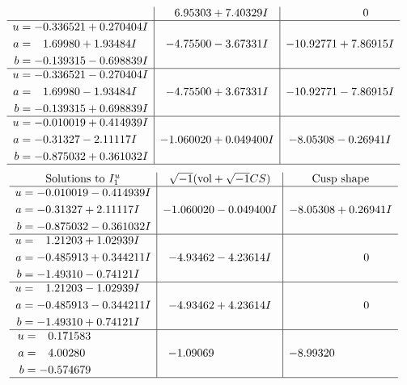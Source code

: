 \documentclass[1p]{elsarticle_modified}
\theoremstyle{definition}
\newcommand{\I}{\sqrt{-1}}
\begin{document}
$$\begin{array}{c|c|c}
 & \phantom{-}6.95303 + 7.40329 I & \phantom{-0.000000 } 0 \\ \hline\begin{aligned}
u &= -0.336521 + 0.270404 I \\
a &= \phantom{-}1.69980 + 1.93484 I \\
b &= -0.139315 - 0.698839 I\end{aligned}
 & -4.75500 - 3.67331 I & -10.92771 + 7.86915 I \\ \hline\begin{aligned}
u &= -0.336521 - 0.270404 I \\
a &= \phantom{-}1.69980 - 1.93484 I \\
b &= -0.139315 + 0.698839 I\end{aligned}
 & -4.75500 + 3.67331 I & -10.92771 - 7.86915 I \\ \hline\begin{aligned}
u &= -0.010019 + 0.414939 I \\
a &= -0.31327 - 2.11117 I \\
b &= -0.875032 + 0.361032 I\end{aligned}
 & -1.060020 + 0.049400 I & -8.05308 - 0.26941 I\\
 \hline 
 \end{array}$$\newpage$$\begin{array}{c|c|c}  
\text{Solutions to }I^u_{1}& \I (\text{vol} + \sqrt{-1}CS) & \text{Cusp shape}\\
 \hline 
\begin{aligned}
u &= -0.010019 - 0.414939 I \\
a &= -0.31327 + 2.11117 I \\
b &= -0.875032 - 0.361032 I\end{aligned}
 & -1.060020 - 0.049400 I & -8.05308 + 0.26941 I \\ \hline\begin{aligned}
u &= \phantom{-}1.21203 + 1.02939 I \\
a &= -0.485913 + 0.344211 I \\
b &= -1.49310 - 0.74121 I\end{aligned}
 & -4.93462 - 4.23614 I & \phantom{-0.000000 } 0 \\ \hline\begin{aligned}
u &= \phantom{-}1.21203 - 1.02939 I \\
a &= -0.485913 - 0.344211 I \\
b &= -1.49310 + 0.74121 I\end{aligned}
 & -4.93462 + 4.23614 I & \phantom{-0.000000 } 0 \\ \hline\begin{aligned}
u &= \phantom{-}0.171583\phantom{ +0.000000I} \\
a &= \phantom{-}4.00280\phantom{ +0.000000I} \\
b &= -0.574679\phantom{ +0.000000I}\end{aligned}
 & -1.09069\phantom{ +0.000000I} & -8.99320\phantom{ +0.000000I}\\
 \hline 
 \end{array}$$\newpage\newpage\renewcommand{\arraystretch}{1}
\end{document}
